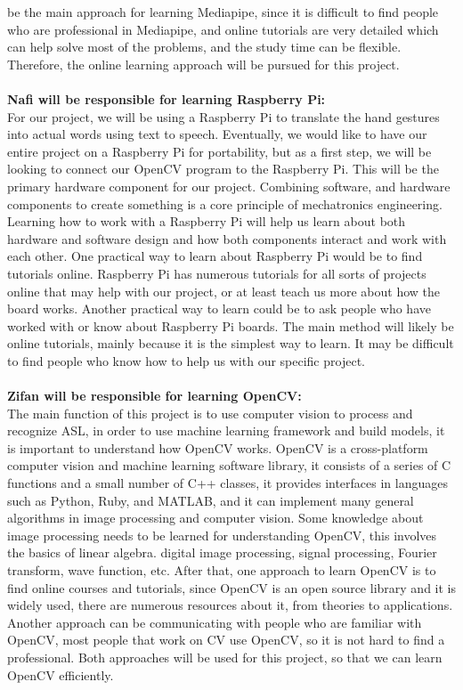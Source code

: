 \documentclass[12pt]{article}
\begin{document}
be the main approach for learning Mediapipe, since it is difficult to find people who are professional in Mediapipe, and online tutorials are very detailed which can help 
solve most of the problems, and the study time can be flexible. Therefore, the online learning approach will be pursued for this project.\\
~\\
\textbf{Nafi will be responsible for learning Raspberry Pi:}\\
For our project, we will be using a Raspberry Pi to translate the hand gestures into actual words using text to speech. Eventually, we
would like to have our entire project on a Raspberry Pi for portability, but as a first step, we will be looking to connect our OpenCV 
program to the Raspberry Pi. This will be the primary hardware component for our project. Combining software, and hardware components to 
create something is a core principle of mechatronics engineering. Learning how to work with a Raspberry Pi will help us learn about both 
hardware and software design and how both components interact and work with each other. One practical way to learn about Raspberry Pi would
be to find tutorials online. Raspberry Pi has numerous tutorials for all sorts of projects online that may help with our project, or at least
teach us more about how the board works. Another practical way to learn could be to ask people who have worked with or know about Raspberry 
Pi boards. The main method will likely be online tutorials, mainly because it is the simplest way to learn. It may be difficult to find people
who know how to help us with our specific project.\\
~\\
\textbf{Zifan will be responsible for learning OpenCV:}\\
The main function of this project is to use computer vision to process and recognize ASL, in order to use machine learning framework and build models, it is important to understand how OpenCV works. OpenCV is a cross-platform computer vision and machine learning software library, it consists of a series of C functions and a small number of C++ classes, it provides interfaces in languages ​​such as Python, Ruby, and MATLAB, and it can implement many general algorithms in image processing and computer vision. Some knowledge about image processing needs to be learned for understanding OpenCV, this involves the basics of linear algebra. digital image processing, signal processing, Fourier transform, wave function, etc. After that, one approach to learn OpenCV is to find online courses and tutorials, since OpenCV is an open source library and it is widely used, there are numerous resources about it, from theories to applications. Another approach can be communicating with people who are familiar with OpenCV, most people that work on CV use OpenCV, so it is not hard to find a professional. Both approaches will be used for this project, so that we can learn OpenCV efficiently.\\
\end{document}
